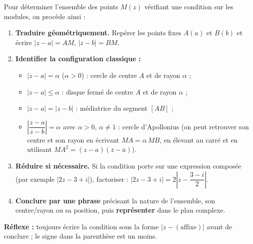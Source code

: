 \documentclass[11pt]{article}
\newcommand{\cle}[1]{{\popxbold\color{popdark}#1}}
\begin{document}
\begin{methode}
Pour déterminer l'ensemble des points $M(z)$ vérifiant une condition sur les modules, on procède ainsi :
\begin{enumerate}
\item \textbf{Traduire géométriquement.} Repérer les points fixes $A(a)$ et $B(b)$ et écrire $|z-a|=AM$, $|z-b|=BM$.
\item \textbf{Identifier la configuration classique :}
\begin{itemize}
\item $|z-a|=\alpha$ ($\alpha>0$) : \cle{cercle} de centre $A$ et de rayon $\alpha$ ;
\item $|z-a|\leq\alpha$ : \cle{disque fermé} de centre $A$ et de rayon $\alpha$ ;
\item $|z-a|=|z-b|$ : \cle{médiatrice} du segment $[AB]$ ;
\item $\left|\dfrac{z-a}{z-b}\right|=\alpha$ avec $\alpha>0$, $\alpha\neq 1$ : \cle{cercle d'Apollonius} (on peut retrouver son centre et son rayon en écrivant $MA=\alpha\, MB$, en élevant au carré et en utilisant $MA^2=(z-a)(\overline{z}-\overline{a})$).
\end{itemize}
\item \textbf{Réduire si nécessaire.} Si la condition porte sur une expression composée (par exemple $|2z-3+i|$), factoriser : $|2z-3+i|=2\left|z-\dfrac{3-i}{2}\right|$.
\item \textbf{Conclure par une phrase} précisant la nature de l'ensemble, son centre/rayon ou sa position, puis \textbf{représenter} dans le plan complexe.
\end{enumerate}
\textbf{Réflexe :} toujours écrire la condition sous la forme $|z - (\text{affixe})|$ avant de conclure ; le signe dans la parenthèse est un moins.
\end{methode}
\end{document}
